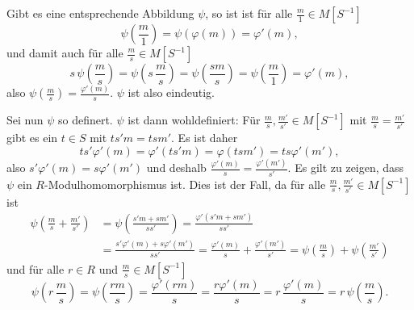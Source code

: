\documentclass[a4paper,10pt]{article}
\theoremstyle{definition}
\begin{document}
Gibt es eine entsprechende Abbildung $\psi$, so ist ist für alle $\frac{m}{1} \in M[S^{-1}]$
\[
 \psi\left(\frac{m}{1}\right)
 = \psi(\varphi(m))
 = \varphi'(m),
\]
und damit auch für alle $\frac{m}{s} \in M[S^{-1}]$
\[
 s \, \psi\left( \frac{m}{s} \right)
 = \psi\left( s \, \frac{m}{s} \right)
 = \psi\left( \frac{sm}{s} \right)
 = \psi\left( \frac{m}{1} \right)
 = \varphi'(m),
\]
also $\psi\left(\frac{m}{s}\right) = \frac{\varphi'(m)}{s}$. $\psi$ ist also eindeutig.

Sei nun $\psi$ so definert. $\psi$ ist dann wohldefiniert: Für $\frac{m}{s}, \frac{m'}{s'} \in M[S^{-1}]$ mit $\frac{m}{s} = \frac{m'}{s'}$ gibt es ein $t \in S$ mit $ts'm = tsm'$. Es ist daher
\[
 t s' \varphi'(m) = \varphi'(t s' m) = \varphi(tsm') = ts \varphi'(m'),
\]
also $s' \varphi'(m) = s \varphi'(m')$ und deshalb $\frac{\varphi'(m)}{s} = \frac{\varphi'(m')}{s'}$. Es gilt zu zeigen, dass $\psi$ ein $R$-Modulhomomorphismus ist. Dies ist der Fall, da für alle $\frac{m}{s}, \frac{m'}{s'} \in M[S^{-1}]$ ist
\begin{align*}
 \psi\left( \frac{m}{s} + \frac{m'}{s'} \right)
 &= \psi\left( \frac{s'm + sm'}{ss'} \right)
 = \frac{ \varphi'(s'm + sm') }{ss'} \\
 &= \frac{ s'\varphi'(m) + s\varphi'(m') }{ss'}
 = \frac{\varphi'(m)}{s} + \frac{\varphi'(m')}{s'}
 = \psi\left(\frac{m}{s}\right) + \psi\left(\frac{m'}{s'}\right)
\end{align*}
und für alle $r \in R$ und $\frac{m}{s} \in M[S^{-1}]$
\[
 \psi\left(r \, \frac{m}{s}\right)
 = \psi\left(\frac{rm}{s}\right)
 = \frac{\varphi'(rm)}{s}
 = \frac{r\varphi'(m)}{s}
 = r \, \frac{\varphi'(m)}{s}
 = r \, \psi\left(\frac{m}{s}\right).
\]
\end{document}
